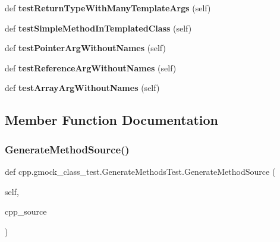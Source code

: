 \begin{DoxyCompactItemize}
\item 
\mbox{\label{classcpp_1_1gmock__class__test_1_1GenerateMethodsTest_affdc748928d26be259345ed6a8753988}} 
def {\bfseries test\+Return\+Type\+With\+Many\+Template\+Args} (self)
\item 
\mbox{\label{classcpp_1_1gmock__class__test_1_1GenerateMethodsTest_a964a1b55f2096edf7a6165734b1f0619}} 
def {\bfseries test\+Simple\+Method\+In\+Templated\+Class} (self)
\item 
\mbox{\label{classcpp_1_1gmock__class__test_1_1GenerateMethodsTest_a6a2118fde4c59d2f8f402652e7aa8896}} 
def {\bfseries test\+Pointer\+Arg\+Without\+Names} (self)
\item 
\mbox{\label{classcpp_1_1gmock__class__test_1_1GenerateMethodsTest_af82b50cc3f5daee5f6650fff1323e30c}} 
def {\bfseries test\+Reference\+Arg\+Without\+Names} (self)
\item 
\mbox{\label{classcpp_1_1gmock__class__test_1_1GenerateMethodsTest_a544cd40e30b5dc3fbcf42385f0a54ad1}} 
def {\bfseries test\+Array\+Arg\+Without\+Names} (self)
\end{DoxyCompactItemize}


\subsection{Member Function Documentation}
\mbox{\label{classcpp_1_1gmock__class__test_1_1GenerateMethodsTest_af96a6c9fd394f7e27cf24f86814549c9}} 
\subsubsection{\texorpdfstring{Generate\+Method\+Source()}{GenerateMethodSource()}}
{\footnotesize\ttfamily def cpp.\+gmock\+\_\+class\+\_\+test.\+Generate\+Methods\+Test.\+Generate\+Method\+Source (\begin{DoxyParamCaption}\item[{}]{self,  }\item[{}]{cpp\+\_\+source }\end{DoxyParamCaption})}

